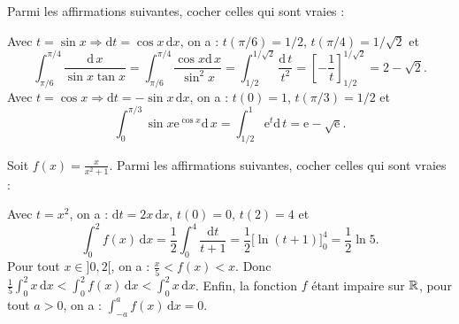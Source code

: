 \begin{question}
Parmi les affirmations suivantes, cocher celles qui sont vraies :
\begin{answers}
\end{answers}
\vskip3mm
\begin{explanations}
Avec $t=\sin x\Rightarrow \mathrm{d}t=\cos x\, \mathrm{d}x$, on a : $t(\pi/6)=1/2$, $t(\pi/4)=1/\sqrt{2}$ et 
$$\displaystyle \int _{\pi/6}^{\pi/4}\frac{\mathrm{d}\, x}{\sin x\tan x}=\int _{\pi/6}^{\pi/4}\frac{\cos x\mathrm{d}\, x}{\sin ^2x}=\int _{1/2}^{1/\sqrt{2}}\frac{\mathrm{d}\, t}{t^2}=\left[-\frac{1}{t}\right]_{1/2}^{1/\sqrt{2}}=2-\sqrt{2}.$$
Avec $t=\cos x\Rightarrow \mathrm{d}t=-\sin x\, \mathrm{d}x$, on a : $t(0)=1$, $t(\pi/3)=1/2$ et 
$$\displaystyle \int _{0}^{\pi/3}\sin x\mathrm{e}^{\cos x}\mathrm{d}\, x=\int _{1/2}^1\mathrm{e}^t\mathrm{d}\, t=\mathrm{e}-\sqrt{\mathrm{e}}.$$
\end{explanations}
\end{question}

\begin{question}
Soit $\displaystyle f(x)=\frac{x}{x^2+1}$. Parmi les affirmations suivantes, cocher celles qui sont vraies :
\begin{answers} 
\end{answers}
\begin{explanations}
Avec $t=x^2$, on a : $\mathrm{d}t=2x\, \mathrm{d}x$, $t(0)=0$, $t(2)=4$ et
$$\int _0^2f(x)\,\mathrm{d}x=\frac{1}{2}\int _0^{4}\frac{\mathrm{d}t}{t+1}=\frac{1}{2}\Big[\ln (t+1)\Big]^4_0=\frac{1}{2}\ln 5.$$
Pour tout $x\in ]0,2[$, on a : $\displaystyle \frac{x}{5}<f(x)<x$. Donc $\displaystyle \frac{1}{5}\int _0^{2}x\, \mathrm{d}x<\int _0^2f(x)\, \mathrm{d}x<\int _0^{2}x\, \mathrm{d}x$. Enfin, la fonction $f$ étant impaire sur $\mathbb{R}$, pour tout $a>0$, on a : $\displaystyle \int _{-a}^af(x)\, \mathrm{d}x=0$.
\end{explanations}
\end{question}

